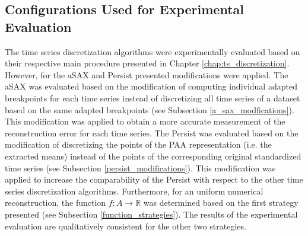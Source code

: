 \subsection*{Configurations Used for Experimental Evaluation}
The time series discretization algorithms were experimentally evaluated based on their respective main procedure presented in Chapter \ref{chap:ts_discretization}. However, for the \ac{aSAX} and Persist presented modifications were applied. The \ac{aSAX} was evaluated based on the modification of computing individual adapted breakpoints for each time series instead of discretizing all time series of a dataset based on the same adapted breakpoints (see Subsection \ref{a_sax_modfications}). This modification was applied to obtain a more accurate measurement of the reconstruction error for each time series. The Persist was evaluated based on the modification of discretizing the points of the \ac{PAA} representation (i.e. the extracted means) instead of the points of the corresponding original standardized time series (see Subsection \ref{persist_modifications}). This modification was applied to increase the comparability of the Persist with respect to the other time series discretization algorithms. \newline
Furthermore, for an uniform numerical reconstruction, the function $f: A \rightarrow \mathbb{R}$ was determined based on the first strategy presented (see Subsection \ref{function_strategies}). The results of the experimental evaluation are qualitatively consistent for the other two strategies.   
